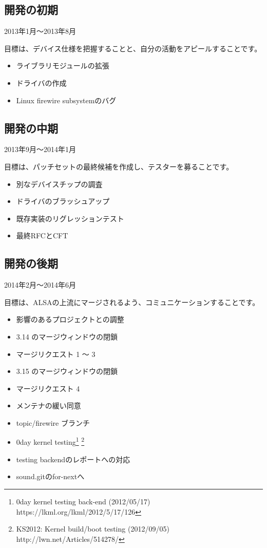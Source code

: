 \documentclass[mingoth,a4paper]{jsarticle}
\begin{document}
\subsection{開発の初期}

2013年1月〜2013年8月

目標は、デバイス仕様を把握することと、自分の活動をアピールすることです。

\begin{itemize}
\itemsep1pt\parskip0pt
\item
  ライブラリモジュールの拡張
\item
  ドライバの作成
\item
  Linux firewire subsystemのバグ
\end{itemize}


\subsection{開発の中期}

2013年9月〜2014年1月

目標は、パッチセットの最終候補を作成し、テスターを募ることです。

\begin{itemize}
\itemsep1pt\parskip0pt
\item
  別なデバイスチップの調査
\item
  ドライバのブラッシュアップ
\item
  既存実装のリグレッションテスト
\item
  最終RFCとCFT
\end{itemize}


\subsection{開発の後期}

2014年2月〜2014年6月

目標は、ALSAの上流にマージされるよう、コミュニケーションすることです。

\begin{itemize}
\itemsep1pt\parskip0pt
\item
  影響のあるプロジェクトとの調整
\item
  3.14 のマージウィンドウの閉鎖
\item
  マージリクエスト 1 〜 3
\item
  3.15 のマージウィンドウの閉鎖
\item
  マージリクエスト 4
\item
  メンテナの緩い同意
\item
  topic/firewire ブランチ
\item
  0day kernel testing\footnote{0day kernel testing back-end (2012/05/17) https://lkml.org/lkml/2012/5/17/126} \footnote{KS2012: Kernel build/boot testing (2012/09/05) http://lwn.net/Articles/514278/}
\item
  testing backendのレポートへの対応
\item
  sound.gitのfor-nextへ
\end{itemize}
\end{document}
